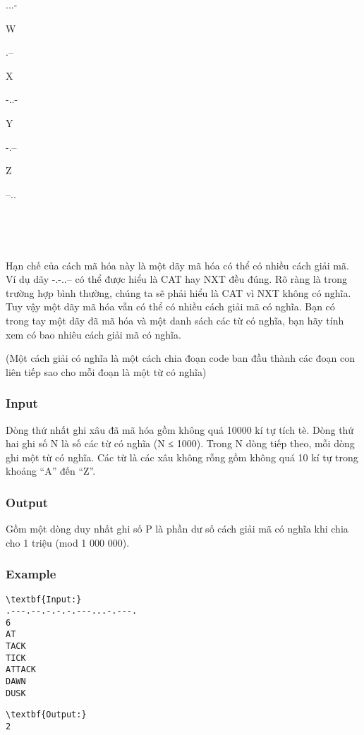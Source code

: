 ...-

W

.--

X

-..-

Y

-.--

Z

--..

 

 

Hạn chế của cách mã hóa này là một dãy mã hóa có thể có nhiều cách giải mã. Ví dụ dãy -.-..-- có thể được hiểu là CAT hay NXT đều đúng. Rõ ràng là trong trường hợp bình thường, chúng ta sẽ phải hiểu là CAT vì NXT không có nghĩa. Tuy vậy một dãy mã hóa vẫn có thể có nhiều cách giải mã có nghĩa. Bạn có trong tay một dãy đã mã hóa và một danh sách các từ có nghĩa, bạn hãy tính xem có bao nhiêu cách giải mã có nghĩa.

(Một cách giải có nghĩa là một cách chia đoạn code ban đầu thành các đoạn con liên tiếp sao cho mỗi đoạn là một từ có nghĩa)

\subsubsection{Input}

Dòng thứ nhất ghi xâu đã mã hóa gồm không quá 10000 kí tự tích tè. Dòng thứ hai ghi số N là số các từ có nghĩa (N ≤ 1000). Trong N dòng tiếp theo, mỗi dòng ghi một từ có nghĩa. Các từ là các xâu không rỗng gồm không quá 10 kí tự trong khoảng “A” đến “Z”.

\subsubsection{Output}

Gồm một dòng duy nhất ghi số P là phần dư số cách giải mã có nghĩa khi chia cho 1 triệu (mod 1 000 000).

\subsubsection{Example}
\begin{verbatim}
\textbf{Input:}
.---.--.-.-.-.---...-.---.
6
AT
TACK
TICK
ATTACK
DAWN
DUSK \end{verbatim}
\begin{verbatim}
\textbf{Output:}
2
\end{verbatim}